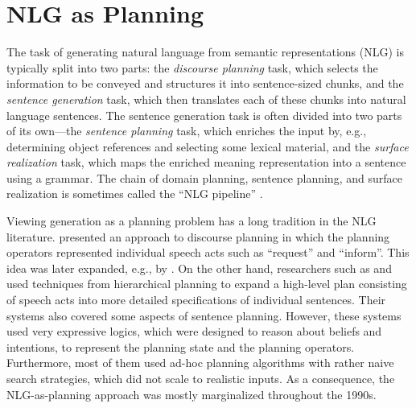 \section{NLG as Planning} \label{sec:nlg-as-planning}

The task of generating natural language from semantic representations (NLG) is
typically split into two parts: the \emph{discourse planning} task, which
selects the information to be conveyed and structures it into sentence-sized
chunks, and the \emph{sentence generation} task, which then translates each of
these chunks into natural language sentences. The sentence generation task is
often divided into two parts of its own---the \emph{sentence planning} task,
which enriches the input by, e.g., determining object references and selecting
some lexical material, and the \emph{surface realization} task, which maps the
enriched meaning representation into a sentence using a grammar. The chain of
domain planning, sentence planning, and surface realization is sometimes called
the ``NLG pipeline'' \citep{reiter00building}.

Viewing generation as a planning problem has a long tradition in the NLG
literature. \citet{perrault80} presented an approach to discourse planning in
which the planning operators represented individual speech acts such as
``request'' and ``inform''. This idea was later expanded, e.g., by
\citet{young94dpocl}. On the other hand, researchers such as
\citet{appelt:planning} and \citet{hovy88} used techniques from hierarchical
planning to expand a high-level plan consisting of speech acts into more
detailed specifications of individual sentences. Their systems also covered some
aspects of sentence planning. However, these systems used very expressive
logics, which were designed to reason about beliefs and intentions, to represent
the planning state and the planning operators. Furthermore, most of them used
ad-hoc planning algorithms with rather naive search strategies, which did not
scale to realistic inputs. As a consequence, the NLG-as-planning approach was
mostly marginalized throughout the 1990s.

